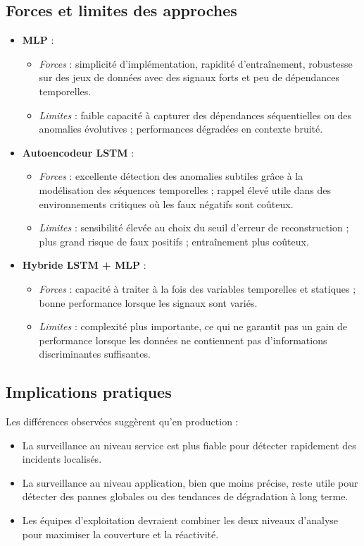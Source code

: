 \documentclass[a4paper,12pt]{report}
\begin{document}
\subsection*{Forces et limites des approches}

\begin{itemize}
    \item \textbf{MLP} :
    \begin{itemize}
        \item \textit{Forces} : simplicité d’implémentation, rapidité d’entraînement, robustesse sur des jeux de données avec des signaux forts et peu de dépendances temporelles.
        \item \textit{Limites} : faible capacité à capturer des dépendances séquentielles ou des anomalies évolutives ; performances dégradées en contexte bruité.
    \end{itemize}
    \item \textbf{Autoencodeur LSTM} :
    \begin{itemize}
        \item \textit{Forces} : excellente détection des anomalies subtiles grâce à la modélisation des séquences temporelles ; rappel élevé utile dans des environnements critiques où les faux négatifs sont coûteux.
        \item \textit{Limites} : sensibilité élevée au choix du seuil d’erreur de reconstruction ; plus grand risque de faux positifs ; entraînement plus coûteux.
    \end{itemize}
    \item \textbf{Hybride LSTM + MLP} :
    \begin{itemize}
        \item \textit{Forces} : capacité à traiter à la fois des variables temporelles et statiques ; bonne performance lorsque les signaux sont variés.
        \item \textit{Limites} : complexité plus importante, ce qui ne garantit pas un gain de performance lorsque les données ne contiennent pas d’informations discriminantes suffisantes.
    \end{itemize}
\end{itemize}

\subsection*{Implications pratiques}

Les différences observées suggèrent qu’en production :
\begin{itemize}
    \item La surveillance au niveau service est plus fiable pour détecter rapidement des incidents localisés.
    \item La surveillance au niveau application, bien que moins précise, reste utile pour détecter des pannes globales ou des tendances de dégradation à long terme.
    \item Les équipes d’exploitation devraient combiner les deux niveaux d’analyse pour maximiser la couverture et la réactivité.
\end{itemize}
\end{document}
